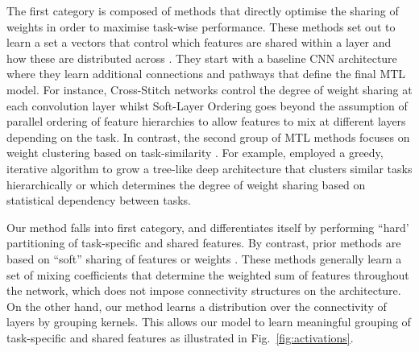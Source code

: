 The first category is composed of methods that directly optimise the sharing of weights in order to maximise task-wise performance. These methods set out to learn a set a vectors that control which features are shared within a layer and how these are distributed across \cite{long2017learning, meyerson2018beyond, MisraCrossMTL16, Ruder2019SluiceNL}. They start with a baseline CNN architecture where they learn additional connections and pathways that define the final MTL model. For instance, Cross-Stitch networks \cite{MisraCrossMTL16} control the degree of weight sharing at each convolution layer whilst Soft-Layer Ordering \cite{meyerson2018beyond} goes beyond the assumption of parallel ordering of feature hierarchies to allow features to mix at different layers depending on the task. In contrast, the second group of MTL methods focuses on weight clustering based on task-similarity \cite{xue2007multi, jacob2009, Kang2011,lu2017fully,mejjati2018multi}. For example, \cite{lu2017fully} employed a greedy, iterative algorithm to grow a tree-like deep architecture that clusters similar tasks hierarchically or \cite{mejjati2018multi} which determines the degree of weight sharing based on statistical dependency between tasks.

Our method falls into first category, and differentiates itself by performing ``hard' partitioning of task-specific and shared features. By contrast, prior methods are based on ``soft'' sharing of features \cite{MisraCrossMTL16,Ruder2019SluiceNL} or weights \cite{long2017learning,meyerson2018beyond}. These methods generally learn a set of mixing coefficients that determine the weighted sum of features throughout the network, which does not impose connectivity structures on the architecture. On the other hand, our method learns a distribution over the connectivity of layers by grouping kernels. This allows our model to learn meaningful grouping of task-specific and shared features as illustrated in Fig.~\ref{fig:activations}. 








